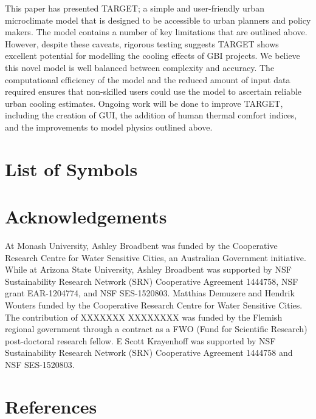 \documentclass[gmd, manuscript]{copernicus}
\begin{document}
This paper has presented TARGET; a simple and user-friendly urban microclimate model that is designed to be accessible to urban planners and policy makers. The model contains a number of key limitations that are outlined above. However, despite these caveats, rigorous testing suggests TARGET shows excellent potential for modelling the cooling effects of GBI projects. We believe this novel model is well balanced between  complexity and accuracy. The computational efficiency of the model and the reduced amount of input data required ensures that non-skilled users could use the model to ascertain reliable urban cooling estimates. Ongoing work will be done to improve TARGET, including the creation of GUI, the addition of human thermal comfort indices, and the improvements to model physics outlined above. 




\section{List of Symbols}\label{sec:symbollist}   



\section*{Acknowledgements}
At Monash University, Ashley Broadbent was funded by the Cooperative Research Centre for Water Sensitive Cities, an Australian Government initiative. While at Arizona State University, Ashley Broadbent was supported by NSF Sustainability Research Network (SRN) Cooperative Agreement 1444758,  NSF grant EAR-1204774, and NSF SES-1520803. Matthias Demuzere and Hendrik Wouters funded by the Cooperative Research Centre for Water Sensitive Cities. The contribution of XXXXXXX XXXXXXXX was funded by the Flemish regional government through a contract as a FWO (Fund for Scientific Research) post-doctoral research fellow. E Scott Krayenhoff  was supported by NSF Sustainability Research Network (SRN) Cooperative Agreement 1444758 and NSF SES-1520803. 


\section*{References}\label{sec:ref}


  


\end{document}
